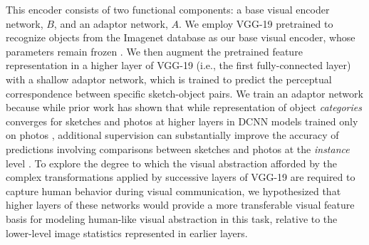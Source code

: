 \documentclass[9pt,twocolumn,twoside]{pnas-new}
\begin{document}
This encoder consists of two functional components: a base visual encoder network, $B$, and an adaptor network, $A$. 
We employ VGG-19 pretrained to recognize objects from the Imagenet database as our base visual encoder, whose parameters remain frozen \cite{simonyan2014very}. 
We then augment the pretrained feature representation in a higher layer of VGG-19 (i.e., the first fully-connected layer) with a shallow adaptor network, which is trained to predict the perceptual correspondence between specific sketch-object pairs. 
We train an adaptor network because while prior work has shown that while   representation of object \textit{categories} converges for sketches and photos at higher layers in DCNN models trained only on photos \cite{FanCommon2018}, additional supervision can substantially improve the accuracy of predictions involving comparisons between sketches and photos at the \textit{instance} level \cite{sangkloy2016sketchy}. 
To explore the degree to which the visual abstraction afforded by the complex transformations applied by successive layers of VGG-19 are required to capture human behavior during visual communication, we hypothesized that higher layers of these networks would provide a more transferable visual feature basis for modeling human-like visual abstraction in this task, relative to the lower-level image statistics represented in earlier layers.

\end{document}
